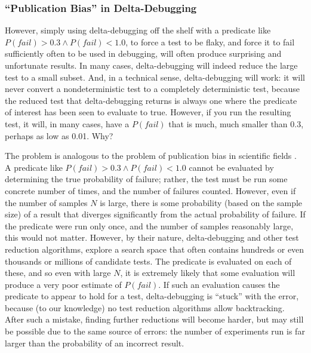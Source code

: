 \subsubsection{``Publication Bias'' in Delta-Debugging}

However, simply using delta-debugging off the shelf with a predicate
like $P(fail) > 0.3 \wedge P(fail) < 1.0$, to force a test to be flaky, and force it to fail
sufficiently often to be used in debugging, will often produce
surprising and unfortunate results.  In many cases,
delta-debugging will indeed reduce the large test to a small subset.
And, in a technical sense, delta-debugging will work:  it will never
convert a nondeterministic test to a completely deterministic test,
because the reduced test that delta-debugging returns is always one
where the predicate of interest has been seen to evaluate to true.
However, if you run the resulting test, it will, in many cases, have a
$P(fail)$ that is much, much smaller than
0.3, perhaps as low as 0.01.  Why?

The problem is analogous to the problem of publication bias in
scientific fields \cite{ahmed2012assessment}.  A predicate like
$P(fail) > 0.3 \wedge P(fail) < 1.0$ cannot be evaluated by
determining the true probability of failure; rather, the test must be
run some concrete number of times, and the number of failures counted.
However, even if the number of samples $N$ is large, there is some
probability (based on the sample size) of a result that diverges
significantly from the actual probability of failure.  If the
predicate were run only once, and the number of samples reasonably
large, this would not matter.  However, by their nature,
delta-debugging and other test reduction algorithms, explore a search
space that often contains hundreds or even thousands or millions of
candidate tests.  The predicate is evaluated on each of these, and so
even with large $N$, it is extremely likely that some evaluation will
produce a very poor estimate of $P(fail)$.  If such an evaluation
causes the predicate to appear to hold for a test, delta-debugging is
``stuck'' with the error, because (to our knowledge) no test reduction
algorithms allow backtracking.  After such a mistake, finding further
reductions will become harder, but may still be possible due to the
same source of errors:  the number of experiments run is far larger
than the probability of an incorrect result.

